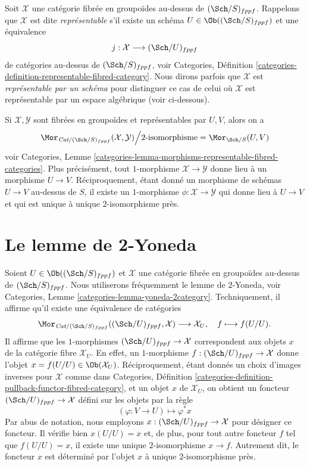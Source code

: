 \medskip\noindent
Soit $\mathcal{X}$ une catégorie fibrée en groupoïdes au-dessus de
$(\Sch/S)_{fppf}$. Rappelons que $\mathcal{X}$
est dite {\it représentable} s'il existe un
schéma $U \in \Ob((\Sch/S)_{fppf})$ et une
équivalence
$$
j : \mathcal{X} \longrightarrow (\Sch/U)_{fppf}
$$
de catégories au-dessus de $(\Sch/S)_{fppf}$, voir
Categories,
Définition \ref{categories-definition-representable-fibred-category}.
Nous dirons parfois que $\mathcal{X}$ est
{\it représentable par un schéma} pour distinguer ce cas de celui où
$\mathcal{X}$ est représentable par un espace algébrique (voir
ci-dessous).

\medskip\noindent
Si $\mathcal{X}, \mathcal{Y}$ sont fibrées en groupoïdes et
représentables par $U, V$, alors on a
\begin{equation}
\label{equation-morphisms-schemes}
\Mor_{\textit{Cat}/(\Sch/S)_{fppf}}(\mathcal{X}, \mathcal{Y})
\Big/
2\text{-isomorphisme}
=
\Mor_{\Sch/S}(U, V)
\end{equation}
voir
Categories,
Lemme \ref{categories-lemma-morphisms-representable-fibred-categories}.
Plus précisément, tout $1$-morphisme $\mathcal{X} \to \mathcal{Y}$
donne lieu à un morphisme $U \to V$. Réciproquement, étant donné un morphisme
de schémas $U \to V$ au-dessus de $S$, il existe un $1$-morphisme
$\phi : \mathcal{X} \to \mathcal{Y}$ qui donne lieu à $U \to V$
et qui est unique à unique $2$-isomorphisme près.






\section{Le lemme de 2-Yoneda}
\label{section-2-yoneda}

\noindent
Soient $U \in \Ob((\Sch/S)_{fppf})$ et $\mathcal{X}$ une
catégorie fibrée en groupoïdes au-dessus de $(\Sch/S)_{fppf}$.
Nous utiliserons fréquemment le lemme de $2$-Yoneda, voir
Categories, Lemme \ref{categories-lemma-yoneda-2category}.
Techniquement, il affirme qu'il existe une équivalence de catégories
$$
\Mor_{\textit{Cat}/(\Sch/S)_{fppf}}(
(\Sch/U)_{fppf}, \mathcal{X})
\longrightarrow
\mathcal{X}_U, \quad
f \longmapsto f(U/U).
$$
Il affirme que les $1$-morphismes $(\Sch/U)_{fppf} \to \mathcal{X}$
correspondent aux objets $x$ de la catégorie fibre $\mathcal{X}_U$.
En effet, un $1$-morphisme $f : (\Sch/U)_{fppf} \to \mathcal{X}$
donne l'objet $x = f(U/U) \in \Ob(\mathcal{X}_U)$.
Réciproquement, étant donnés un choix d'images inverses pour $\mathcal{X}$ comme dans
Categories,
Définition \ref{categories-definition-pullback-functor-fibred-category},
et un objet $x$ de $\mathcal{X}_U$, on obtient un foncteur
$(\Sch/U)_{fppf} \to \mathcal{X}$ défini sur les objets par la règle
$$
(\varphi : V \to U) \longmapsto \varphi^*x
$$
Par abus de notation, nous employons
$x : (\Sch/U)_{fppf} \to \mathcal{X}$
pour désigner ce foncteur. Il vérifie bien $x(U/U) = x$
et, de plus, pour tout autre foncteur $f$ tel que $f(U/U) = x$, il existe
une unique $2$-isomorphisme $x \to f$. Autrement dit, le foncteur $x$
est déterminé par l'objet $x$ à unique $2$-isomorphisme près.

